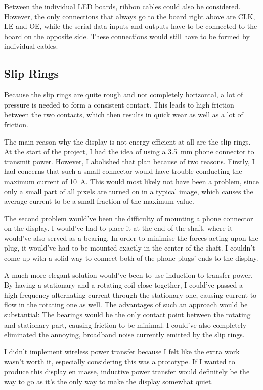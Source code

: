 \documentclass[a4paper, 11pt, titlepage]{report}
\begin{document}
Between the individual LED boards, ribbon cables could also be considered. However, the only
connections that always go to the board right above are CLK, LE and OE, while the serial data
inputs and outputs have to be connected to the board on the opposite side. These connections would
still have to be formed by individual cables.


\subsection{Slip Rings}

Because the slip rings are quite rough and not completely horizontal, a lot of pressure is needed
to form a consistent contact. This leads to high friction between the two contacts, which then
results in quick wear as well as a lot of friction.

The main reason why the display is not energy efficient at all are the slip rings. At the start of
the project, I had the idea of using a \SI{3.5}{\milli\meter} phone connector to transmit power.
However, I abolished that plan because of two reasons. Firstly, I had concerns that such a small
connector would have trouble conducting the maximum current of \SI{10}{\ampere}. This would most
likely not have been a problem, since only a small part of all pixels are turned on in a typical
image, which causes the average current to be a small fraction of the maximum value.

The second problem would've been the difficulty of mounting a phone connector on the display. I
would've had to place it at the end of the shaft, where it would've also served as a bearing. In
order to minimise the forces acting upon the plug, it would've had to be mounted exactly in the
center of the shaft. I couldn't come up with a solid way to connect both of the phone plugs' ends
to the display.

A much more elegant solution would've been to use induction to transfer power. By having a
stationary and a rotating coil close together, I could've passed a high-frequency alternating
current through the stationary one, causing current to flow in the rotating one as well. The
advantages of such an approach would be substantial: The bearings would be the only contact point
between the rotating and stationary part, causing friction to be minimal. I could've also
completely eliminated the annoying, broadband noise currently emitted by the slip rings.

I didn't implement wireless power transfer because I felt like the extra work wasn't worth it,
especially considering this was a prototype. If I wanted to produce this display en masse,
inductive power transfer would definitely be the way to go as it's the only way to make the
display somewhat quiet.
\end{document}

